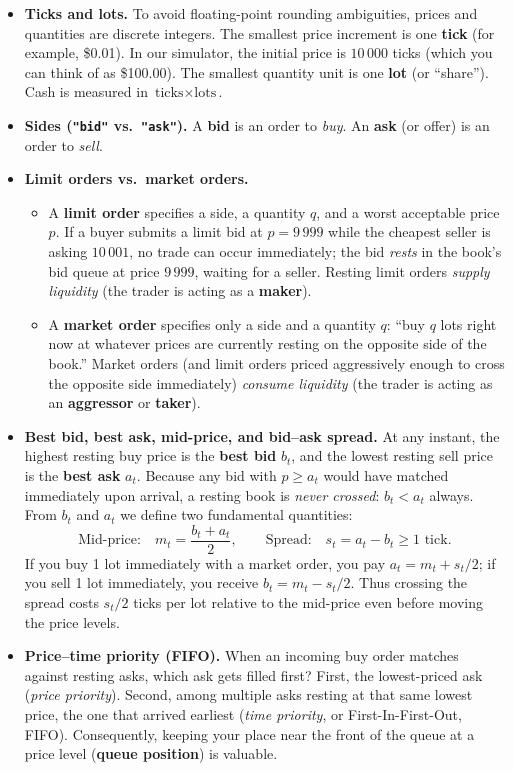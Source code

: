 \documentclass[11pt,a4paper]{article}
\newcommand{\code}[1]{\texttt{#1}}
\begin{document}
\begin{itemize}[nosep]
\item \textbf{Ticks and lots.} To avoid floating-point rounding ambiguities, prices and quantities are
  discrete integers. The smallest price increment is one \textbf{tick} (for example, \$0.01). In our
  simulator, the initial price is $10\,000$ ticks (which you can think of as \$100.00). The smallest
  quantity unit is one \textbf{lot} (or ``share''). Cash is measured in $\text{ticks}\times\text{lots}$.
\item \textbf{Sides (\code{"bid"} vs.\ \code{"ask"}).} A \textbf{bid} is an order to \emph{buy}. An
  \textbf{ask} (or offer) is an order to \emph{sell}.
\item \textbf{Limit orders vs.\ market orders.}
  \begin{itemize}[nosep]
  \item A \textbf{limit order} specifies a side, a quantity $q$, and a worst acceptable price $p$. If a
    buyer submits a limit bid at $p = 9\,999$ while the cheapest seller is asking $10\,001$, no trade
    can occur immediately; the bid \emph{rests} in the book's bid queue at price $9\,999$, waiting for a
    seller. Resting limit orders \emph{supply liquidity} (the trader is acting as a \textbf{maker}).
  \item A \textbf{market order} specifies only a side and a quantity $q$: ``buy $q$ lots right now at
    whatever prices are currently resting on the opposite side of the book.'' Market orders (and limit
    orders priced aggressively enough to cross the opposite side immediately) \emph{consume liquidity}
    (the trader is acting as an \textbf{aggressor} or \textbf{taker}).
  \end{itemize}
\item \textbf{Best bid, best ask, mid-price, and bid--ask spread.} At any instant, the highest resting
  buy price is the \textbf{best bid} $b_t$, and the lowest resting sell price is the \textbf{best ask}
  $a_t$. Because any bid with $p \ge a_t$ would have matched immediately upon arrival, a resting book is
  \emph{never crossed}: $b_t < a_t$ always. From $b_t$ and $a_t$ we define two fundamental quantities:
  \begin{equation}
    \text{Mid-price:}\quad m_t = \frac{b_t + a_t}{2}, \qquad
    \text{Spread:}\quad s_t = a_t - b_t \ge 1\text{ tick}.
  \end{equation}
  If you buy 1 lot immediately with a market order, you pay $a_t = m_t + s_t/2$; if you sell 1 lot
  immediately, you receive $b_t = m_t - s_t/2$. Thus crossing the spread costs $s_t/2$ ticks per lot
  relative to the mid-price even before moving the price levels.
\item \textbf{Price--time priority (FIFO).} When an incoming buy order matches against resting asks,
  which ask gets filled first? First, the lowest-priced ask (\emph{price priority}). Second, among
  multiple asks resting at that same lowest price, the one that arrived earliest (\emph{time priority},
  or First-In-First-Out, FIFO). Consequently, keeping your place near the front of the queue at a price
  level (\textbf{queue position}) is valuable.
\end{itemize}
\end{document}
